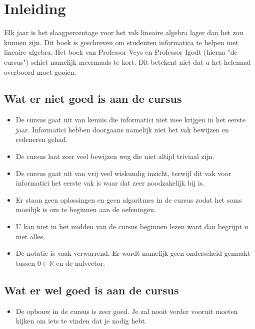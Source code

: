 \documentclass[lineaire_algebra_oplossingen.tex]{subfiles}
\begin{document}
\newpage
\section*{Inleiding}
Elk jaar is het slaagpercentage voor het vak lineaire algebra lager dan het zou kunnen zijn. Dit boek is geschreven om studenten informatica te helpen met lineaire algebra. Het boek van Professor Veys en Professor Igodt (hierna "de cursus") schiet namelijk meermaals te kort. Dit betekent niet dat u het helemaal overboord moet gooien.

\subsection*{Wat er niet goed is aan de cursus}
\begin{itemize}
\item De cursus gaat uit van kennis die informatici niet mee krijgen in het eerste jaar. Informatici hebben doorgaans namelijk niet het vak bewijzen en redeneren gehad.
\item De cursus laat zeer veel bewijzen weg die niet altijd triviaal zijn.
\item De cursus gaat uit van vrij veel wiskundig inzicht, terwijl dit vak voor informatici het eerste vak is waar dat zeer noodzakelijk bij is.
\item Er staan geen oplossingen en geen algoritmes in de cursus zodat het soms moeilijk is om te beginnen aan de oefeningen.
\item U kan niet in het midden van de cursus beginnen lezen want dan begrijpt u niet alles.
\item De notatie is vaak verwarrend. Er wordt namelijk geen onderscheid gemaakt tussen $0\in \mathbb{R}$ en de nulvector.
\end{itemize}
\subsection*{Wat er wel goed is aan de cursus}
\begin{itemize}
\item De opbouw in de cursus is zeer goed. Je zal nooit verder vooruit moeten kijken om iets te vinden dat je nodig hebt.
\end{itemize}
\end{document}
